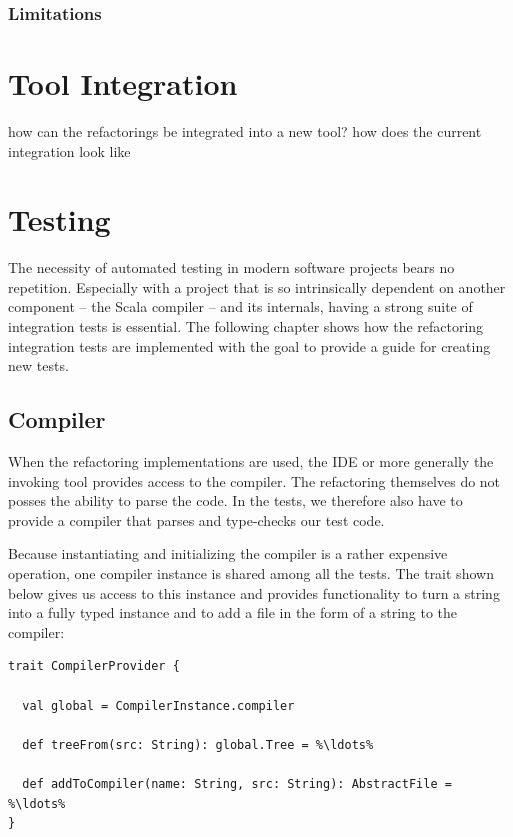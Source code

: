\documentclass[10pt,a4paper,oneside]{scrreprt}
\begin{document}
\subsection{Limitations}

\chapter{Tool Integration} \label{chapter:tool-integration}

how can the refactorings be integrated into a new tool?
how does the current integration look like

\chapter{Testing} \label{chapter:testing}

The necessity of automated testing in modern software projects bears no repetition. Especially with a project that is so intrinsically dependent on another component -- the Scala compiler -- and its internals, having a strong suite of integration tests is essential. The following chapter shows how the refactoring integration tests are implemented with the goal to provide a guide for creating new tests.

\section{Compiler}

When the refactoring implementations are used, the IDE or more generally the invoking tool provides access to the compiler. The refactoring themselves do not posses the ability to parse the code. In the tests, we therefore also have to provide a compiler that parses and type-checks our test code.

Because instantiating and initializing the compiler is a rather expensive operation, one compiler instance is shared among all the tests. The  trait shown below gives us access to this instance and provides functionality to turn a string into a fully typed  instance and to add a file in the form of a string to the compiler:

\begin{lstlisting}
trait CompilerProvider {

  val global = CompilerInstance.compiler
    
  def treeFrom(src: String): global.Tree = %\ldots%
  
  def addToCompiler(name: String, src: String): AbstractFile = %\ldots%
}
\end{lstlisting}
\end{document}
